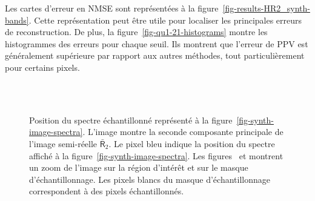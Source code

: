 Les cartes d'erreur en NMSE sont représentées à la figure~\ref{fig-results-HR2_synth-bands}. Cette représentation peut être utile pour localiser les principales erreurs de reconstruction. De plus, la figure~\ref{fig-qu1-21-histograms} montre les histogrammes des erreurs pour chaque seuil. Ils montrent que l'erreur de PPV est généralement supérieure par rapport aux autres méthodes, tout particulièrement pour certains pixels.

\begin{figure}[htbp]
    \centering
    \\
    \hskip 20pt
    \\
    \caption{Position du spectre échantillonné représenté à la figure~\protect\ref{fig-synth-image-spectra}.
        L'image  montre la seconde composante principale de l'image semi-réelle $\bar{\mathsf{R}}_2$. Le pixel bleu indique la position du spectre affiché à la figure~\protect\ref{fig-synth-image-spectra}. Les figures~\protect{} et  \protect{} montrent un zoom de l'image sur la région d'intérêt et sur le masque d'échantillonnage. Les pixels blancs du masque d'échantillonnage correspondent à des pixels échantillonnés.
        \protect\label{fig-synth-image-spectra-locations}}
\end{figure}

